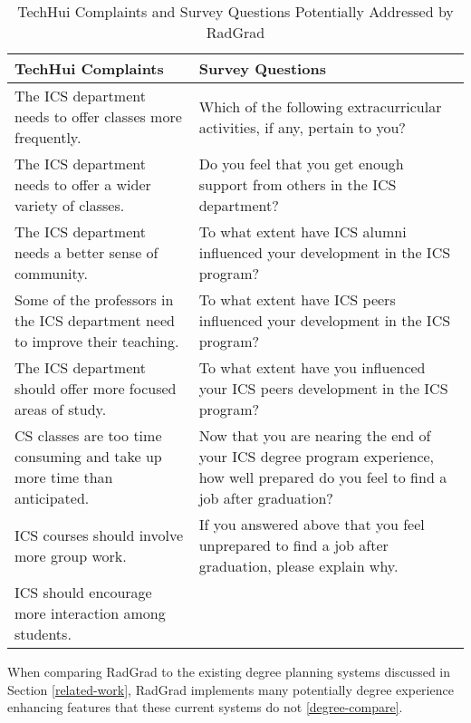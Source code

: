 \begin{table}[htbp!]
\centering
 \caption{TechHui Complaints and Survey Questions Potentially Addressed by RadGrad}
\begin{tabular}{ |p{8cm}|p{8cm}|} 
  \hline
 \textbf{TechHui Complaints} & \textbf{Survey Questions} \\ 
  \hline
The ICS department needs to offer classes more frequently. & Which of the following extracurricular activities, if any, pertain to you?\\
  \hline
  The ICS department needs to offer a wider variety of classes. & Do you feel that you get enough support from others in the ICS department?\\
  \hline
  The ICS department needs a better sense of community. & To what extent have ICS alumni influenced your development in the ICS program?\\
  \hline
  Some of the professors in the ICS department need to improve their teaching. & To what extent have ICS peers influenced your development in the ICS program?\\
  \hline
  The ICS department should offer more focused areas of study. & To what extent have you influenced your ICS peers development in the ICS program?\\
  \hline
  CS classes are too time consuming and take up more time than anticipated. & Now that you are nearing the end of your ICS degree program experience, how well prepared do you feel to find a job after graduation?\\
  \hline
  ICS courses should involve more group work. &  If you answered above that you feel unprepared to find a job after graduation, please explain why. \\
  \hline
    ICS should encourage more interaction among students. & \\
  \hline
\end{tabular}
  \label{techhui-survey}
\end{table}

When comparing RadGrad to the existing degree planning systems discussed in Section \ref{related-work}, RadGrad implements many potentially degree experience enhancing features that these current systems do not \ref{degree-compare}. 

